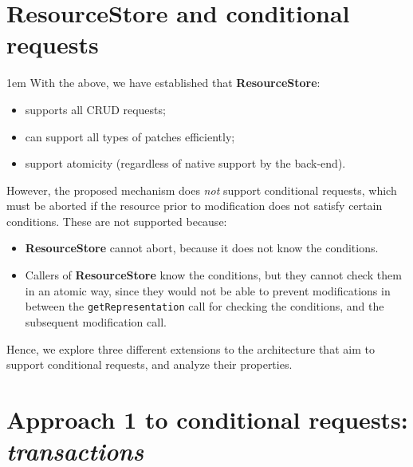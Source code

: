 \documentclass[10pt]{article}
\newenvironment{Note}
  {\begin{multicols}{3}%
     \parskip 1em}
  {\end{multicols}}
\begin{document}
\section*{ResourceStore and conditional requests}
\begin{Note}
With the above,
we have established that \textbf{ResourceStore}:
\begin{itemize}
  \item supports all CRUD requests;
  \item can support all types of patches efficiently;
  \item support atomicity
        (regardless of native support by the back-end).
\end{itemize}

\columnbreak
However, the proposed mechanism
does \emph{not} support conditional requests,
which must be aborted if the resource
prior to modification
does not satisfy certain conditions.
These are not supported because:
\begin{itemize}
  \item \textbf{ResourceStore} cannot abort,
        because it does not know the conditions.
  \item Callers of \textbf{ResourceStore} know the conditions,
        but they cannot check them in an atomic way,
        since they would not be able to prevent modifications
        in between the \verb!getRepresentation! call for checking the conditions,
        and the subsequent modification call.
\end{itemize}

\columnbreak
Hence,
we explore three different extensions to the architecture
that aim to support conditional requests,
and analyze their properties.

\end{Note}

\clearpage

\section*{Approach 1 to conditional requests: \emph{transactions}}
\end{document}
